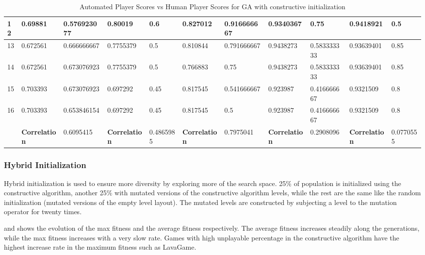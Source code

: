 \begin{landscape}
\begin{table}[!ht]
\begin{tabular}{|p{0.5in}|p{0.75in}|p{0.75in}|p{0.75in}|p{0.75in}|p{0.75in}|p{0.75in}|p{0.75in}|p{0.75in}|p{0.75in}|p{0.75in}|}
		\hline
		12 & 0.69881 & 0.576923077 & 0.80019 & 0.6 & 0.827012 & 0.916666667 & 0.9340367 & 0.75 & 0.9418921 & 0.5\\
		\hline
		13 & 0.672561 & 0.666666667 & 0.7755379 & 0.5 & 0.810844 & 0.791666667 & 0.9438273 & 0.583333333 & 0.93639401 & 0.85\\
		\hline
		14 & 0.672561 & 0.673076923 & 0.7755379 & 0.5 & 0.766883 & 0.75 & 0.9438273 & 0.583333333 & 0.93639401 & 0.85\\
		\hline
		15 & 0.703393 & 0.673076923 & 0.697292 & 0.45 & 0.817545 & 0.541666667 & 0.923987 & 0.416666667 & 0.9321509 & 0.8\\
		\hline
		16 & 0.703393 & 0.653846154 & 0.697292 & 0.45 & 0.817545 & 0.5 & 0.923987 & 0.416666667 & 0.9321509 & 0.8\\
		\hline
		& \textbf{Correlation} & 0.6095415 & \textbf{Correlation} & 0.4865985 & \textbf{Correlation} & 0.7975041 & \textbf{Correlation} & 0.2908096 & \textbf{Correlation} & 0.0770555\\
		\hline
	\end{tabular}
	\caption{Automated Player Scores vs Human Player Scores for GA with constructive initialization}
	\label{Table:constructiveGAScores}
\end{table}
\end{landscape}

\subsubsection{Hybrid Initialization}
Hybrid initialization is used to ensure more diversity by exploring more of the search space. 25\% of population is initialized using the constructive algorithm, another 25\% with mutated versions of the constructive algorithm levels, while the rest are the same like the random initialization (mutated versions of the empty level layout). The mutated levels are constructed by subjecting a level to the mutation operator for twenty times.\\\par 

 and  shows the evolution of the max fitness and the average fitness respectively. The average fitness increases steadily along the generations, while the max fitness increases with a very slow rate. Games with high unplayable percentage in the constructive algorithm have the highest increase rate in the maximum fitness such as LavaGame.


